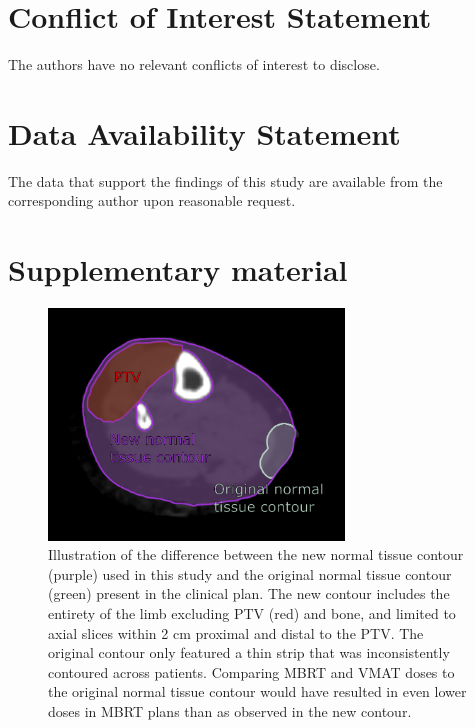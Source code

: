 \documentclass[aapm,graphicx,superscriptaddress]{revtex4-1}
\begin{document}
\section{Conflict of Interest Statement}
The authors have no relevant conflicts of interest to disclose.

\section{Data Availability Statement}
The data that support the findings of this study are available from the corresponding author upon reasonable request.




\section{Supplementary material}

\begin{figure}
    \centering
    \includegraphics[width=0.7\textwidth]{normaltissue.png}
    \caption{Illustration of the difference between the new normal tissue contour (purple) used in this study and the original normal tissue contour (green) present in the clinical plan. The new contour includes the entirety of the limb excluding PTV (red) and bone, and limited to axial slices within 2 cm proximal and distal to the PTV. The original contour only featured a thin strip that was inconsistently contoured across patients. Comparing MBRT and VMAT doses to the original normal tissue contour would have resulted in even lower doses in MBRT plans than as observed in the new contour.}
    \label{fig:normaltissuecontour}
\end{figure}
\end{document}
